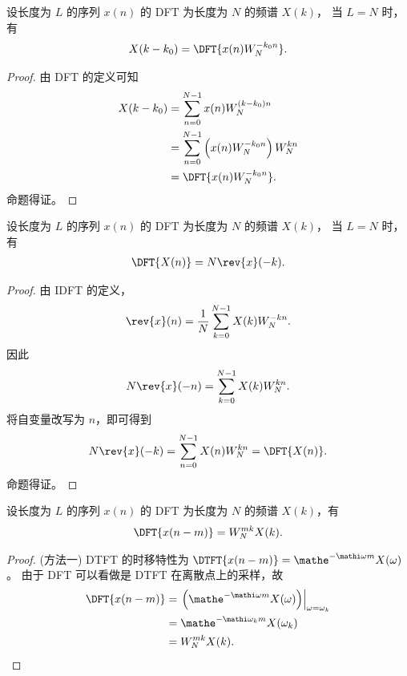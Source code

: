 \begin{property}
    设长度为 $L$ 的序列 $x(n)$ 的 DFT 为长度为 $N$ 的频谱 $X(k)$，
    当 $L = N$ 时，有
    \begin{align*}
        X(k - k_0) = \DFT{x(n)W_N^{-k_0n}}.
    \end{align*}
\end{property}

\begin{proof}
    由 DFT 的定义可知
    \begin{align*}
        X(k - k_0) & = \sum_{n = 0}^{N - 1}x(n)W_N^{(k - k_0)n} \\
        & = \sum_{n = 0}^{N - 1}\left(x(n)W_N^{-k_0n}\right)W_N^{kn} \\
        & = \DFT{x(n)W_N^{-k_0n}}.
    \end{align*}
    命题得证。
\end{proof}

\begin{property}
    设长度为 $L$ 的序列 $x(n)$ 的 DFT 为长度为 $N$ 的频谱 $X(k)$，
    当 $L = N$ 时，有
    \begin{align*}
        \DFT{X(n)} = N\rev{x}(-k).
    \end{align*}
\end{property}

\begin{proof}
    由 IDFT 的定义，
    \begin{align*}
        \rev{x}(n) = \frac{1}{N}\sum_{k = 0}^{N - 1}X(k)W_N^{-kn}.
    \end{align*}
    因此
    \begin{align*}
        N\rev{x}(-n) = \sum_{k = 0}^{N - 1}X(k)W_N^{kn}.
    \end{align*}
    将自变量改写为 $n$，即可得到
    \begin{align*}
        N\rev{x}(-k) = \sum_{n = 0}^{N - 1}X(n)W_N^{kn} = \DFT{X(n)}.
    \end{align*}
    命题得证。
\end{proof}

\begin{property}
    设长度为 $L$ 的序列 $x(n)$ 的 DFT 为长度为 $N$ 的频谱 $X(k)$，有
    \begin{align*}
        \DFT{x(n - m)} = W_N^{mk}X(k).
    \end{align*}
\end{property}

\begin{proof}
    (方法一)
    DTFT 的时移特性为 $\DTFT{x(n - m)} = \mathe^{-\mathi\omega m}X(\omega)$。
    由于 DFT 可以看做是 DTFT 在离散点上的采样，故
    \begin{align*}
        \DFT{x(n - m)} & = \left.\left(\mathe^{-\mathi\omega m}X(\omega)\right)\right|_{\omega = \omega_k} \\
        & = \mathe^{-\mathi\omega_k m}X(\omega_k) \\
        & = W_N^{mk}X(k).
    \end{align*}
\end{proof}

